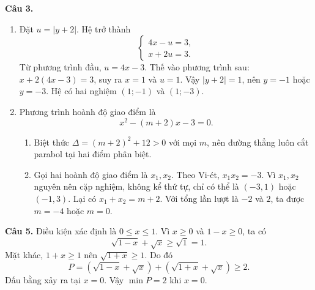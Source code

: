 \documentclass[12pt,a4paper]{article}
\begin{document}
\textbf{Câu 3.}
\begin{enumerate}[label=\arabic*)]
  \item Đặt $u=|y+2|$. Hệ trở thành
  \[
  \begin{cases}4x-u=3,\\x+2u=3.\end{cases}
  \]
  Từ phương trình đầu, $u=4x-3$. Thế vào phương trình sau: $x+2(4x-3)=3$, suy ra $x=1$ và $u=1$. Vậy $|y+2|=1$, nên $y=-1$ hoặc $y=-3$. Hệ có hai nghiệm $(1;-1)$ và $(1;-3)$.
  \item Phương trình hoành độ giao điểm là
  \[
  x^2-(m+2)x-3=0.
  \]
  \begin{enumerate}[label=\alph*)]
    \item Biệt thức $\Delta=(m+2)^2+12>0$ với mọi $m$, nên đường thẳng luôn cắt parabol tại hai điểm phân biệt.
    \item Gọi hai hoành độ giao điểm là $x_1,x_2$. Theo Vi-ét, $x_1x_2=-3$. Vì $x_1,x_2$ nguyên nên cặp nghiệm, không kể thứ tự, chỉ có thể là $(-3,1)$ hoặc $(-1,3)$. Lại có $x_1+x_2=m+2$. Với tổng lần lượt là $-2$ và $2$, ta được $m=-4$ hoặc $m=0$.
  \end{enumerate}
\end{enumerate}

\textbf{Câu 5.} Điều kiện xác định là $0\le x\le1$. Vì $x\ge0$ và $1-x\ge0$, ta có
\[
\sqrt{1-x}+\sqrt{x}\ge\sqrt{1}=1.
\]
Mặt khác, $1+x\ge1$ nên $\sqrt{1+x}\ge1$. Do đó
\[
P=(\sqrt{1-x}+\sqrt{x})+(\sqrt{1+x}+\sqrt{x})\ge2.
\]
Dấu bằng xảy ra tại $x=0$. Vậy $\min P=2$ khi $x=0$.
\end{document}
